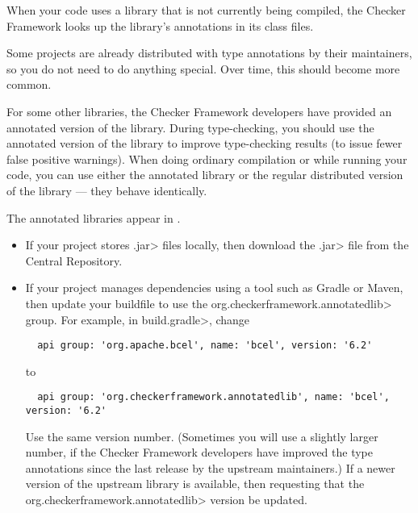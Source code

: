 When your code uses a library that is not currently being compiled, the
Checker Framework looks up the library's annotations in its class files.

Some projects are already distributed with type annotations by their
maintainers, so you do not need to do anything special.
Over time, this should become more common.

For some other libraries, the Checker Framework developers have provided an
annotated version of the library.  During type-checking, you should use the
annotated version of the library to improve type-checking results (to issue
fewer false positive warnings).  When doing ordinary compilation or while
running your code, you can use either the annotated library or the regular
distributed version of the library --- they behave identically.

The annotated libraries appear in
.

\begin{itemize}
\item
If your project stores \<.jar> files locally, then download the \<.jar> file
from the Central Repository.

\item
If your project manages dependencies using a tool such as Gradle or Maven,
then update your buildfile to use the \<org.checkerframework.annotatedlib>
group.  For example, in \<build.gradle>, change

\begin{Verbatim}
  api group: 'org.apache.bcel', name: 'bcel', version: '6.2'
\end{Verbatim}

\noindent
to

\begin{Verbatim}
  api group: 'org.checkerframework.annotatedlib', name: 'bcel', version: '6.2'
\end{Verbatim}

\noindent
Use the same version number.  (Sometimes you will use a slightly larger
number, if the Checker Framework developers have improved the type
annotations since the last release by the upstream maintainers.)  If a
newer version of the upstream library is available, then
 requesting that the
\<org.checkerframework.annotatedlib> version be updated.
\end{itemize}

